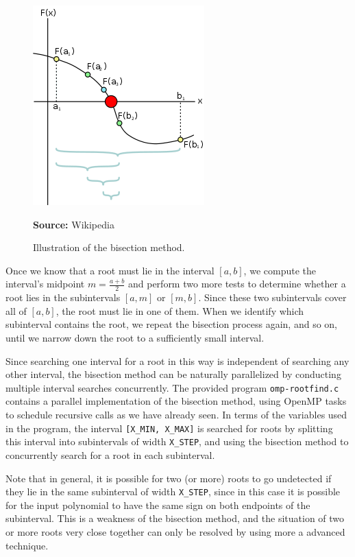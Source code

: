 \documentclass{article}
\theoremstyle{definition}
\begin{document}
\begin{figure}[H]
    \centering
    \includegraphics[scale=0.5]{images/bisection-method-illustration.png}
    \caption{Illustration of the bisection method.}
    \textbf{Source:} Wikipedia
    \label{fig:bisection-method}
\end{figure}

Once we know that a root must lie in the interval $[a, b]$, we compute the interval's midpoint $m = \frac{a+b}{2}$ and perform two more tests to determine whether a root lies in the subintervals $[a, m]$ or $[m, b]$. Since these two subintervals cover all of $[a, b]$, the root must lie in one of them. When we identify which subinterval contains the root, we repeat the bisection process again, and so on, until we narrow down the root to a sufficiently small interval.

Since searching one interval for a root in this way is independent of searching any other interval, the bisection method can be naturally parallelized by conducting multiple interval searches concurrently. The provided program \texttt{omp-rootfind.c} contains a parallel implementation of the bisection method, using OpenMP tasks to schedule recursive calls as we have already seen. In terms of the variables used in the program, the interval \texttt{[X\_MIN, X\_MAX]} is searched for roots by splitting this interval into subintervals of width \texttt{X\_STEP}, and using the bisection method to concurrently search for a root in each subinterval.

Note that in general, it is possible for two (or more) roots to go undetected if they lie in the same subinterval of width \texttt{X\_STEP}, since in this case it is possible for the input polynomial to have the same sign on both endpoints of the subinterval. This is a weakness of the bisection method, and the situation of two or more roots very close together can only be resolved by using more a advanced technique.
\end{document}
